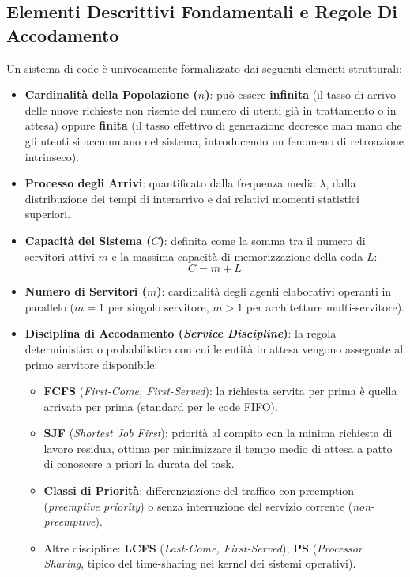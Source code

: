 \documentclass[11pt, a4paper]{article}
\begin{document}
\subsection{Elementi Descrittivi Fondamentali e Regole Di Accodamento}

Un sistema di code è univocamente formalizzato dai seguenti elementi strutturali:
\begin{itemize}[leftmargin=*]
    \item \textbf{Cardinalità della Popolazione ($n$)}: può essere \textbf{infinita} (il tasso di arrivo delle nuove richieste non risente del numero di utenti già in trattamento o in attesa) oppure \textbf{finita} (il tasso effettivo di generazione decresce man mano che gli utenti si accumulano nel sistema, introducendo un fenomeno di retroazione intrinseco).
    \item \textbf{Processo degli Arrivi}: quantificato dalla frequenza media $\lambda$, dalla distribuzione dei tempi di interarrivo e dai relativi momenti statistici superiori.
    \item \textbf{Capacità del Sistema ($C$)}: definita come la somma tra il numero di servitori attivi $m$ e la massima capacità di memorizzazione della coda $L$:
    \[
        \boxed{C = m + L}
    \]
    \item \textbf{Numero di Servitori ($m$)}: cardinalità degli agenti elaborativi operanti in parallelo ($m=1$ per singolo servitore, $m>1$ per architetture multi-servitore).
    \item \textbf{Disciplina di Accodamento (\emph{Service Discipline})}: la regola deterministica o probabilistica con cui le entità in attesa vengono assegnate al primo servitore disponibile:
    \begin{itemize}
        \item \textbf{FCFS} (\emph{First-Come, First-Served}): la richiesta servita per prima è quella arrivata per prima (standard per le code FIFO).
        \item \textbf{SJF} (\emph{Shortest Job First}): priorità al compito con la minima richiesta di lavoro residua, ottima per minimizzare il tempo medio di attesa a patto di conoscere a priori la durata del task.
        \item \textbf{Classi di Priorità}: differenziazione del traffico con preemption (\emph{preemptive priority}) o senza interruzione del servizio corrente (\emph{non-preemptive}).
        \item Altre discipline: \textbf{LCFS} (\emph{Last-Come, First-Served}), \textbf{PS} (\emph{Processor Sharing}, tipico del time-sharing nei kernel dei sistemi operativi).
    \end{itemize}
\end{itemize}
\end{document}
